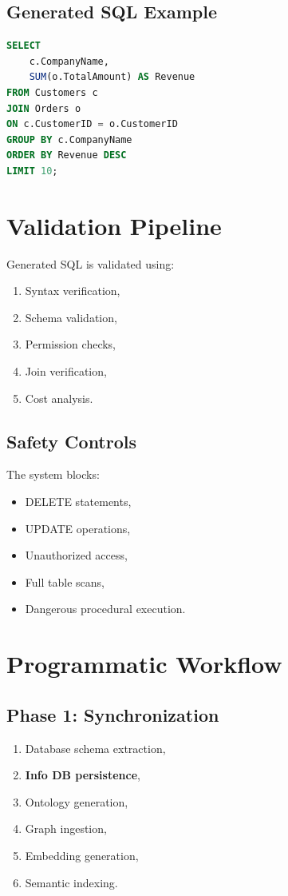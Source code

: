 \documentclass[11pt,a4paper]{article}
\begin{document}
\subsection{Generated SQL Example}

\begin{lstlisting}[language=SQL]
SELECT
    c.CompanyName,
    SUM(o.TotalAmount) AS Revenue
FROM Customers c
JOIN Orders o
ON c.CustomerID = o.CustomerID
GROUP BY c.CompanyName
ORDER BY Revenue DESC
LIMIT 10;
\end{lstlisting}

\section{Validation Pipeline}

Generated SQL is validated using:
\begin{enumerate}
    \item Syntax verification,
    \item Schema validation,
    \item Permission checks,
    \item Join verification,
    \item Cost analysis.
\end{enumerate}

\subsection{Safety Controls}

The system blocks:
\begin{itemize}
    \item DELETE statements,
    \item UPDATE operations,
    \item Unauthorized access,
    \item Full table scans,
    \item Dangerous procedural execution.
\end{itemize}

\section{Programmatic Workflow}

\subsection{Phase 1: Synchronization}

\begin{enumerate}
    \item Database schema extraction,
    \item \textbf{Info DB persistence},
    \item Ontology generation,
    \item Graph ingestion,
    \item Embedding generation,
    \item Semantic indexing.
\end{enumerate}
\end{document}
